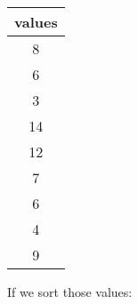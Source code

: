 \documentclass[]{book}
\newenvironment{Shaded}{\begin{snugshade}}{\end{snugshade}}
\newcommand{\KeywordTok}[1]{\textcolor[rgb]{0.13,0.29,0.53}{\textbf{#1}}}
\newcommand{\StringTok}[1]{\textcolor[rgb]{0.31,0.60,0.02}{#1}}
\newcommand{\CommentTok}[1]{\textcolor[rgb]{0.56,0.35,0.01}{\textit{#1}}}
\newcommand{\OperatorTok}[1]{\textcolor[rgb]{0.81,0.36,0.00}{\textbf{#1}}}
\newcommand{\NormalTok}[1]{#1}
\theoremstyle{definition}
\theoremstyle{definition}
\theoremstyle{definition}
\theoremstyle{remark}
\begin{document}
\begin{longtable}[]{@{}c@{}}
\toprule
\begin{minipage}[b]{0.11\columnwidth}\centering\strut
values\strut
\end{minipage}\tabularnewline
\midrule
\endhead
\begin{minipage}[t]{0.11\columnwidth}\centering\strut
8\strut
\end{minipage}\tabularnewline
\begin{minipage}[t]{0.11\columnwidth}\centering\strut
6\strut
\end{minipage}\tabularnewline
\begin{minipage}[t]{0.11\columnwidth}\centering\strut
3\strut
\end{minipage}\tabularnewline
\begin{minipage}[t]{0.11\columnwidth}\centering\strut
14\strut
\end{minipage}\tabularnewline
\begin{minipage}[t]{0.11\columnwidth}\centering\strut
12\strut
\end{minipage}\tabularnewline
\begin{minipage}[t]{0.11\columnwidth}\centering\strut
7\strut
\end{minipage}\tabularnewline
\begin{minipage}[t]{0.11\columnwidth}\centering\strut
6\strut
\end{minipage}\tabularnewline
\begin{minipage}[t]{0.11\columnwidth}\centering\strut
4\strut
\end{minipage}\tabularnewline
\begin{minipage}[t]{0.11\columnwidth}\centering\strut
9\strut
\end{minipage}\tabularnewline
\bottomrule
\end{longtable}

If we sort those values:

\begin{Shaded}
\end{Shaded}
\end{document}
